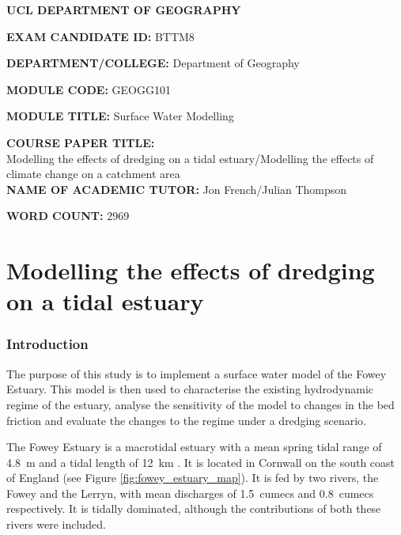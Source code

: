 \documentclass{article}
\begin{document}
\textbf{UCL DEPARTMENT OF GEOGRAPHY}\\[4cm]

\Large

\textbf{EXAM CANDIDATE ID:} BTTM8

\textbf{DEPARTMENT/COLLEGE:} Department of Geography

\textbf{MODULE CODE:} GEOGG101

\textbf{MODULE TITLE:} Surface Water Modelling

\textbf{COURSE PAPER TITLE:} \\
Modelling the effects of dredging on a tidal estuary/Modelling the effects of climate change on a catchment area \\[3cm]

\textbf{NAME OF ACADEMIC TUTOR:} Jon French/Julian Thompson

\textbf{WORD COUNT:} 2969

\normalsize

\newpage


\part*{Modelling the effects of dredging on a tidal estuary}

\section{Introduction}

The purpose of this study is to implement a surface water model of the Fowey Estuary. This model is then used to characterise the existing hydrodynamic regime of the estuary, analyse the sensitivity of the model to changes in the bed friction and evaluate the changes to the regime under a dredging scenario. %

The Fowey Estuary is a macrotidal estuary with a mean spring tidal range of \SI{4.8}{\m} and a tidal length of \SI{12}{km} \parencite{uncles2002dependence}. It is located in Cornwall on the south coast of England (see Figure \ref{fig:fowey_estuary_map}). It is fed by two rivers, the Fowey and the Lerryn, with mean discharges of \SI{1.5}{cumecs} and \SI{0.8}{cumecs} respectively. It is tidally dominated, although the contributions of both these rivers were included.
\end{document}
